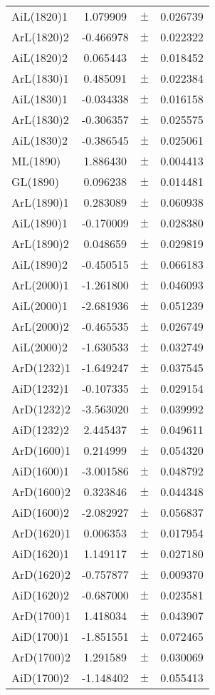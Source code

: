 \begin{table}
\begin{tiny}
\begin{tabular}{lccc}
AiL(1820)1 & 1.079909 & $\pm$ & 0.026739 \\
ArL(1820)2 & -0.466978 & $\pm$ & 0.022322 \\
AiL(1820)2 & 0.065443 & $\pm$ & 0.018452 \\
ArL(1830)1 & 0.485091 & $\pm$ & 0.022384 \\
AiL(1830)1 & -0.034338 & $\pm$ & 0.016158 \\
ArL(1830)2 & -0.306357 & $\pm$ & 0.025575 \\
AiL(1830)2 & -0.386545 & $\pm$ & 0.025061 \\
ML(1890) & 1.886430 & $\pm$ & 0.004413 \\
GL(1890) & 0.096238 & $\pm$ & 0.014481 \\
ArL(1890)1 & 0.283089 & $\pm$ & 0.060938 \\
AiL(1890)1 & -0.170009 & $\pm$ & 0.028380 \\
ArL(1890)2 & 0.048659 & $\pm$ & 0.029819 \\
AiL(1890)2 & -0.450515 & $\pm$ & 0.066183 \\
ArL(2000)1 & -1.261800 & $\pm$ & 0.046093 \\
AiL(2000)1 & -2.681936 & $\pm$ & 0.051239 \\
ArL(2000)2 & -0.465535 & $\pm$ & 0.026749 \\
AiL(2000)2 & -1.630533 & $\pm$ & 0.032749 \\
ArD(1232)1 & -1.649247 & $\pm$ & 0.037545 \\
AiD(1232)1 & -0.107335 & $\pm$ & 0.029154 \\
ArD(1232)2 & -3.563020 & $\pm$ & 0.039992 \\
AiD(1232)2 & 2.445437 & $\pm$ & 0.049611 \\
ArD(1600)1 & 0.214999 & $\pm$ & 0.054320 \\
AiD(1600)1 & -3.001586 & $\pm$ & 0.048792 \\
ArD(1600)2 & 0.323846 & $\pm$ & 0.044348 \\
AiD(1600)2 & -2.082927 & $\pm$ & 0.056837 \\
ArD(1620)1 & 0.006353 & $\pm$ & 0.017954 \\
AiD(1620)1 & 1.149117 & $\pm$ & 0.027180 \\
ArD(1620)2 & -0.757877 & $\pm$ & 0.009370 \\
AiD(1620)2 & -0.687000 & $\pm$ & 0.023581 \\
ArD(1700)1 & 1.418034 & $\pm$ & 0.043907 \\
AiD(1700)1 & -1.851551 & $\pm$ & 0.072465 \\
ArD(1700)2 & 1.291589 & $\pm$ & 0.030069 \\
AiD(1700)2 & -1.148402 & $\pm$ & 0.055413 \\
\bottomrule
\end{tabular}
\end{tiny}
\end{table}

